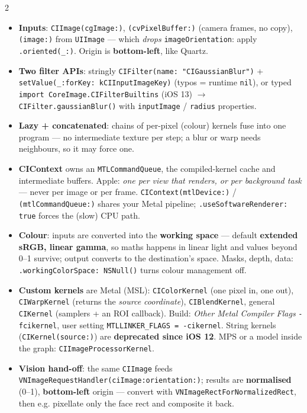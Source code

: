\documentclass[8pt]{extarticle}
\newcommand\ct[1]{\texttt{#1}}
\newcommand\hd[1]{\par\vspace{3pt}\noindent{\bfseries\color{sheetBlue}#1}\par\vspace{1pt}}
\begin{document}
\begin{multicols}{2}
\raggedright{}

\hd{How it works}
\begin{itemize}
  \item \textbf{Inputs}: \ct{CIImage(cgImage:)}, \ct{(cvPixelBuffer:)} (camera frames, no copy),
        \ct{(image:)} from \ct{UIImage} — which \emph{drops}
        \ct{imageOrientation}: apply \ct{.oriented(\_:)}. Origin is \textbf{bottom-left}, like Quartz.
  \item \textbf{Two filter APIs}: stringly \ct{CIFilter(name: "CIGaussianBlur")} +
        \ct{setValue(\_:forKey: kCIInputImageKey)} (typos = runtime \ct{nil}), or typed
        \ct{import CoreImage.CIFilterBuiltins} (iOS 13) $\to$ \ct{CIFilter.gaussianBlur()} with
        \ct{inputImage} / \ct{radius} properties.
  \item \textbf{Lazy + concatenated}: chains of per-pixel (colour) kernels fuse into one program — no
        intermediate texture per step; a blur or warp needs neighbours, so it may force one.
  \item \textbf{CIContext} owns an \ct{MTLCommandQueue}, the compiled-kernel cache and intermediate
        buffers. Apple: \emph{one per view that renders, or per background task} — never per image or
        per frame. \ct{CIContext(mtlDevice:)} / \ct{(mtlCommandQueue:)} shares your Metal pipeline;
        \ct{.useSoftwareRenderer: true} forces the (slow) CPU path.
  \item \textbf{Colour}: inputs are converted into the \textbf{working space} — default
        \textbf{extended sRGB, linear gamma}, so maths happens in linear light and values beyond 0–1
        survive; output converts to the destination's space. Masks, depth, data:
        \ct{.workingColorSpace: NSNull()} turns colour management off.
  \item \textbf{Custom kernels} are Metal (MSL): \ct{CIColorKernel} (one pixel in, one out),
        \ct{CIWarpKernel} (returns the \emph{source coordinate}), \ct{CIBlendKernel}, general
        \ct{CIKernel} (samplers + an ROI callback). Build: \emph{Other Metal Compiler Flags}
        \ct{-fcikernel}, user setting \ct{MTLLINKER\_FLAGS = -cikernel}. String kernels
        (\ct{CIKernel(source:)}) are \textbf{deprecated since iOS 12}. MPS or a model inside the
        graph: \ct{CIImageProcessorKernel}.
  \item \textbf{Vision hand-off}: the same \ct{CIImage} feeds \ct{VNImageRequestHandler(ciImage:orientation:)};
        results are \textbf{normalised} (0–1), \textbf{bottom-left} origin — convert with
        \ct{VNImageRectForNormalizedRect}, then e.g. pixellate only the face rect and composite it back.
\end{itemize}


\end{multicols}
\end{document}

